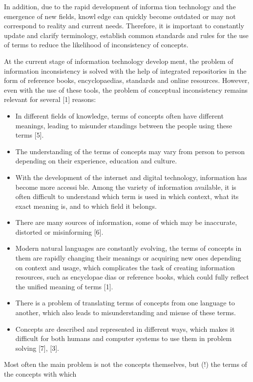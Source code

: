 \documentclass[10pt, a4paper]{article}
\begin{document}
\begin{multicols}{2}
In addition, due to the rapid development of information technology and the emergence of new fields, knowledge can quickly become outdated or may not correspond
to reality and current needs. Therefore, it is important
to constantly update and clarify terminology, establish
common standards and rules for the use of terms to
reduce the likelihood of inconsistency of concepts.

At the current stage of information technology development, the problem of information inconsistency is solved
with the help of integrated repositories in the form of
reference books, encyclopaedias, standards and online
resources. However, even with the use of these tools, the
problem of conceptual inconsistency remains relevant for
several [1] reasons:
\begin{itemize}
    \item In different fields of knowledge, terms of concepts
often have different meanings, leading to misunderstandings between the people using these terms [5].
    \item The understanding of the terms of concepts may
vary from person to person depending on their
experience, education and culture.
    \item With the development of the internet and digital
technology, information has become more accessible. Among the variety of information available, it
is often difficult to understand which term is used
in which context, what its exact meaning is, and to
which field it belongs.
    \item There are many sources of information, some of
which may be inaccurate, distorted or misinforming
[6].
    \item Modern natural languages are constantly evolving,
the terms of concepts in them are rapidly changing
their meanings or acquiring new ones depending on
context and usage, which complicates the task of
creating information resources, such as encyclopaedias or reference books, which could fully reflect
the unified meaning of terms [1].
    \item There is a problem of translating terms of concepts
from one language to another, which also leads to
misunderstanding and misuse of these terms.
\item Concepts are described and represented in different
ways, which makes it difficult for both humans and
computer systems to use them in problem solving
[7], [3].
\end{itemize}
Most often the main problem is not the concepts
themselves, but (!) the terms of the concepts with which

\end{multicols}
\end{document}

